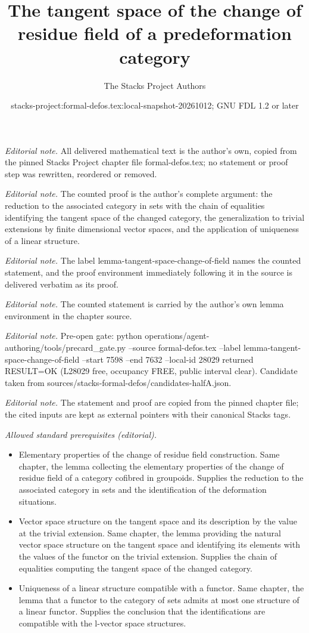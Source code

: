 \documentclass[10pt,a4paper]{amsart}
\title{The tangent space of the change of residue field of a predeformation category}
\author{The Stacks Project Authors}
\date{stacks-project:formal-defos.tex:local-snapshot-20261012; GNU FDL 1.2 or later}
\theoremstyle{plain}
\theoremstyle{definition}
\theoremstyle{remark}
\numberwithin{equation}{subsection}
\begin{document}
\maketitle
\noindent\textit{Editorial note.} All delivered mathematical text is the author's own, copied from the pinned Stacks Project chapter file formal-defos.tex; no statement or proof step was rewritten, reordered or removed.\par\medskip
\noindent\textit{Editorial note.} The counted proof is the author's complete argument: the reduction to the associated category in sets with the chain of equalities identifying the tangent space of the changed category, the generalization to trivial extensions by finite dimensional vector spaces, and the application of uniqueness of a linear structure.\par\medskip
\noindent\textit{Editorial note.} The label lemma-tangent-space-change-of-field names the counted statement, and the proof environment immediately following it in the source is delivered verbatim as its proof.\par\medskip
\noindent\textit{Editorial note.} The counted statement is carried by the author's own lemma environment in the chapter source.\par\medskip
\noindent\textit{Editorial note.} Pre-open gate: python operations/agent-authoring/tools/precard\_gate.py --source formal-defos.tex --label lemma-tangent-space-change-of-field --start 7598 --end 7632 --local-id 28029 returned RESULT=OK (L28029 free, occupancy FREE, public interval clear). Candidate taken from sources/stacks-formal-defos/candidates-halfA.json.\par\medskip
\noindent\textit{Editorial note.} The statement and proof are copied from the pinned chapter file; the cited inputs are kept as external pointers with their canonical Stacks tags.\par\medskip
\noindent\textit{Allowed standard prerequisites (editorial).}\begin{itemize}
\item Elementary properties of the change of residue field construction. Same chapter, the lemma collecting the elementary properties of the change of residue field of a category cofibred in groupoids. Supplies the reduction to the associated category in sets and the identification of the deformation situations.
\item Vector space structure on the tangent space and its description by the value at the trivial extension. Same chapter, the lemma providing the natural vector space structure on the tangent space and identifying its elements with the values of the functor on the trivial extension. Supplies the chain of equalities computing the tangent space of the changed category.
\item Uniqueness of a linear structure compatible with a functor. Same chapter, the lemma that a functor to the category of sets admits at most one structure of a linear functor. Supplies the conclusion that the identifications are compatible with the l-vector space structures.
\end{itemize}\medskip
\end{document}
